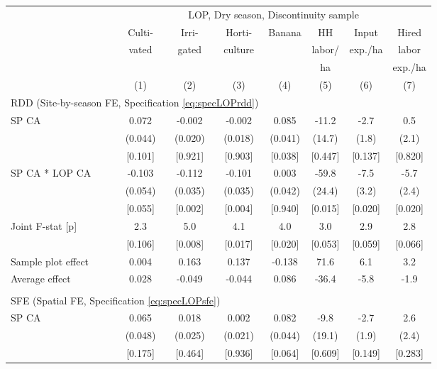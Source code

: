 \begin{tabular}{lccccccc}
\hline \hline
 & \multicolumn{7}{c}{LOP, Dry season, Discontinuity sample} \\
\cmidrule(lr){2-8}
 & Culti- & Irri- & Horti- & Banana & HH & Input & Hired \\
 & vated & gated & culture & & labor/ & exp./ha & labor \\
 & & & & & ha & & exp./ha \\
\cmidrule(lr){2-2}\cmidrule(lr){3-3}\cmidrule(lr){4-4}\cmidrule(lr){5-5}\cmidrule(lr){6-6}\cmidrule(lr){7-7}\cmidrule(lr){8-8}
 & (1) & (2) & (3) & (4) & (5) & (6) & (7) \\
\hline
\multicolumn{4}{l}{RDD (Site-by-season FE, Specification \ref{eq:specLOPrdd})} & & & & \\
\cmidrule(lr){1-4}
SP CA & 0.072 & -0.002\hphantom{-} & -0.002\hphantom{-} & 0.085 & -11.2\hphantom{-} & -2.7\hphantom{-} & 0.5 \\
 & (0.044) & (0.020) & (0.018) & (0.041) & (14.7) & (1.8) & (2.1) \\
 & [0.101] & [0.921] & [0.903] & [0.038] & [0.447] & [0.137] & [0.820] \\
SP CA * LOP CA & -0.103\hphantom{-} & -0.112\hphantom{-} & -0.101\hphantom{-} & 0.003 & -59.8\hphantom{-} & -7.5\hphantom{-} & -5.7\hphantom{-} \\
 & (0.054) & (0.035) & (0.035) & (0.042) & (24.4) & (3.2) & (2.4) \\
 & [0.055] & [0.002] & [0.004] & [0.940] & [0.015] & [0.020] & [0.020] \\
Joint F-stat [p] & 2.3 & 5.0 & 4.1 & 4.0 & 3.0 & 2.9 & 2.8 \\
 & [0.106] & [0.008] & [0.017] & [0.020] & [0.053] & [0.059] & [0.066] \\
\cmidrule(lr){1-8}
Sample plot effect & 0.004 & 0.163 & 0.137 & -0.138 & 71.6 & 6.1 & 3.2 \\
Average effect & 0.028 & -0.049 & -0.044 & 0.086 & -36.4 & -5.8 & -1.9 \\
\cmidrule(lr){1-8}
\\[-0.5em]
\multicolumn{4}{l}{SFE (Spatial FE, Specification \ref{eq:specLOPsfe})} & & & & \\
\cmidrule(lr){1-4}
SP CA & 0.065 & 0.018 & 0.002 & 0.082 & -9.8\hphantom{-} & -2.7\hphantom{-} & 2.6 \\
 & (0.048) & (0.025) & (0.021) & (0.044) & (19.1) & (1.9) & (2.4) \\
 & [0.175] & [0.464] & [0.936] & [0.064] & [0.609] & [0.149] & [0.283] \\

\end{tabular}
